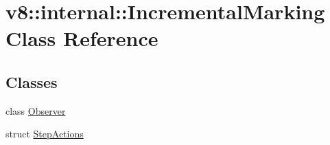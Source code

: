 \hypertarget{classv8_1_1internal_1_1_incremental_marking}{}\section{v8\+:\+:internal\+:\+:Incremental\+Marking Class Reference}
\label{classv8_1_1internal_1_1_incremental_marking}
\subsection*{Classes}
\begin{DoxyCompactItemize}
\item 
class \hyperlink{classv8_1_1internal_1_1_incremental_marking_1_1_observer}{Observer}
\item 
struct \hyperlink{structv8_1_1internal_1_1_incremental_marking_1_1_step_actions}{Step\+Actions}
\end{DoxyCompactItemize}
